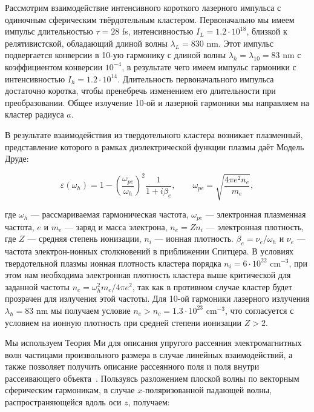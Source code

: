 Рассмотрим взаимодействие интенсивного короткого лазерного импульса с одиночным сферическим твёрдотельным кластером. Первоначально мы имеем импульс длительностью $\tau = 28$ fs, интенсивностью $I_{L} = 1.2 \cdot 10^{18}$, близкой к релятивистской, обладающий длиной волны $\lambda_{L} = 830$ nm. Этот импульс подвергается конверсии в 10-ую гармонику с длиной волны $\lambda_{h} = \lambda_{10} = 83$ nm с коэффициентом конверсии $10^{-4}$, в результате чего имеем импульс гармоники с интенсивностью $I_{h} = 1.2 \cdot 10^{14}$. Длительность первоначального импульса достаточно коротка, чтобы пренебречь изменением его длительности при преобразовании. Общее излучение 10-ой и лазерной гармоники мы направляем на кластер радиуса $a$. 

В результате взаимодействия из твердотельного кластера возникает плазменный, представление которого в рамках диэлектрической функции плазмы даёт Модель Друде:

    \begin{equation}
		\varepsilon (\omega_{h}) = 1 - {\left( \frac{\omega_{pe}}{\omega_{h}} \right)}^2 \frac{1}{1+i \beta_{e}}, \qquad \omega_{pe} = \sqrt{\frac{4 \pi e^2 n_e}{m_e}},
		\label{eps_plasma}
    \end{equation}

\noindent где $\omega_{h}$ --- рассмариваемая гармоническая частота, $\omega_{pe}$ --- электронная плазменная частота, $e$ и $m_e$ --- заряд и масса электрона, $n_e = Z n_i$ --- электронная плотность, где $Z$ --- средняя степень ионизации, $n_i$ --- ионная плотность. $\beta_{e} = \nu_e / \omega_{h}$ и $\nu_e$ --- частота электрон-ионных столкновений в приближении Спитцера. В условиях твердотельной плазмы ионная плотность кластера порядка $n_i = 6 \cdot 10^{22}$ $\textrm{cm}^{-3}$, при этом нам необходима электронная плотность кластера выше критической для заданной частоты $n_c = \omega_{h}^2 m_e / 4 \pi e^2$, так как в противном случае кластер будет прозрачен для излучения этой частоты. Для 10-ой гармоники лазерного излучения $\lambda_{h} = 83$ nm мы получаем условие $n_e > n_c = 1.3 \cdot 10^{23}$ $\textrm{cm}^{-3}$, что согласуется с условием на ионную плотность при средней степени ионизации $Z > 2$.

Мы используем Теория Ми для описания упругого рассеяния электромагнитных волн частицами произвольного размера в случае линейных взаимодействий, а также позволяет получить описание рассеянного поля и поля внутри рассеивающего объекта~\cite{andreev_lecz, boren_huffman}. Пользуясь разложением плоской волны по векторным сферическим гармоникам, в случае $x$-поляризованной падающей волны, распространяющейся вдоль оси $z$, получаем:

